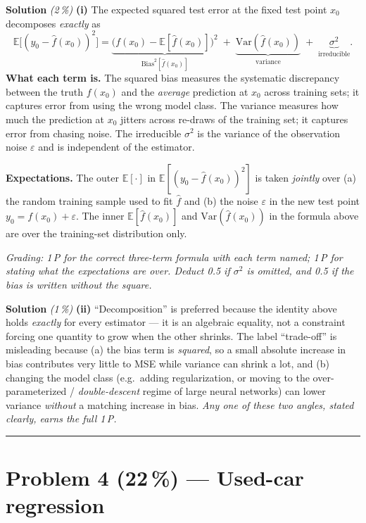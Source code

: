 \documentclass[11pt,a4paper]{article}
\newcommand{\points}[1]{\textbf{(#1\,\%)}}
\newcommand{\subpoints}[1]{\textit{(#1\,\%)}}
\newcommand{\sol}{\noindent\textbf{Solution}}
\begin{document}
\sol{} \subpoints{2} \textbf{(i)} The expected squared test error at the fixed test point $x_0$ decomposes \emph{exactly} as
$$\mathbb{E}\bigl[(y_0-\hat f(x_0))^2\bigr]
   = \underbrace{\bigl(f(x_0)-\mathbb{E}[\hat f(x_0)]\bigr)^2}_{\mathrm{Bias}^2[\hat f(x_0)]}
   \;+\; \underbrace{\mathrm{Var}(\hat f(x_0))}_{\text{variance}}
   \;+\; \underbrace{\sigma^2}_{\text{irreducible}}.$$
\textbf{What each term is.} The squared bias measures the systematic discrepancy between the truth $f(x_0)$ and the \emph{average} prediction at $x_0$ across training sets; it captures error from using the wrong model class. The variance measures how much the prediction at $x_0$ jitters across re-draws of the training set; it captures error from chasing noise. The irreducible $\sigma^2$ is the variance of the observation noise $\varepsilon$ and is independent of the estimator.

\textbf{Expectations.} The outer $\mathbb{E}[\cdot]$ in $\mathbb{E}[(y_0-\hat f(x_0))^2]$ is taken \emph{jointly} over (a) the random training sample used to fit $\hat f$ and (b) the noise $\varepsilon$ in the new test point $y_0=f(x_0)+\varepsilon$. The inner $\mathbb{E}[\hat f(x_0)]$ and $\mathrm{Var}(\hat f(x_0))$ in the formula above are over the training-set distribution only.

\noindent\emph{Grading: 1\,P for the correct three-term formula with each term named; 1\,P for stating what the expectations are over. Deduct 0.5 if $\sigma^2$ is omitted, and 0.5 if the bias is written without the square.}

\medskip
\sol{} \subpoints{1} \textbf{(ii)} ``Decomposition'' is preferred because the identity above holds \emph{exactly} for every estimator --- it is an algebraic equality, not a constraint forcing one quantity to grow when the other shrinks. The label ``trade-off'' is misleading because (a) the bias term is \emph{squared}, so a small absolute increase in bias contributes very little to MSE while variance can shrink a lot, and (b) changing the model class (e.g.\ adding regularization, or moving to the over-parameterized / \emph{double-descent} regime of large neural networks) can lower variance \emph{without} a matching increase in bias. \emph{Any one of these two angles, stated clearly, earns the full 1\,P.}

\vspace{0.6em}
\hrule
\vspace{1em}

\section*{Problem 4 \points{22} --- Used-car regression}
\end{document}
